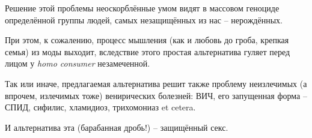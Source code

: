 \documentclass[a4paper,12pt]{report}
\begin{document}
Решение этой проблемы неоскорблённые умом видят в массовом геноциде определённой 
группы людей, самых незащищённых из нас --  нерождённых. 

При этом, к сожалению, процесс мышления (как и любовь до гроба, крепкая семья) из 
моды выходит, вследствие этого простая альтернатива гуляет перед лицом у \textit{homo consumer} 
незамеченной. 

Так или иначе, предлагаемая альтернатива решит также проблему неизлечимых (а впрочем, 
излечимых тоже) венирических болезней: ВИЧ, его запущенная форма -- СПИД, 
сифилис, хламидиоз, трихомониаз et cetera.

И альтернатива эта (барабанная дробь!) -- защищённый секс.
\end{document}
